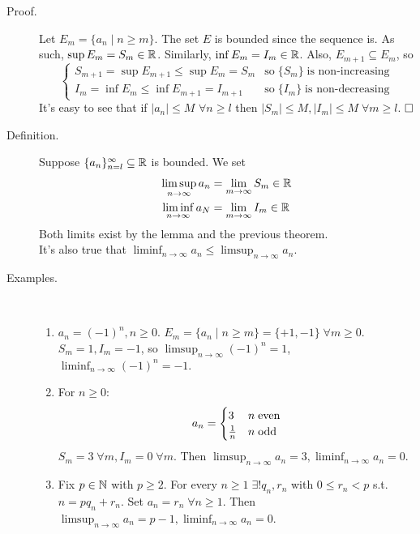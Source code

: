 \documentclass[letterpaper,11pt]{article}
\begin{document}
\begin{description}
\item[Proof.] Let $E_m=\{a_n\;|\;n\ge m\}$. The set $E$ is bounded
    since the sequence is. As such, $\sup E_m=S_m\in\mathbb{R}$. Similarly,
    $\inf E_m=I_m\in\mathbb{R}$. Also, $E_{m+1}\subseteq E_m$, so
    \[
    \begin{cases}
    S_{m+1}=\sup E_{m+1}\le\sup E_m=S_m &
        \text{so}\;\{S_m\}\;\text{is non-increasing}\\
    I_m=\inf E_m\le \inf E_{m+1}=I_{m+1} &
        \text{so}\;\{I_m\}\;\text{is non-decreasing}
    \end{cases}
    \]
    It's easy to see that if $|a_n|\le M$ $\forall n\ge l$ then
    $|S_m|\le M, |I_m|\le M\;\forall m\ge l$. $\hfill\square$


\item[Definition.] Suppose $\{a_n\}_{n=l}^\infty\subseteq\mathbb{R}$ is bounded. We set
    \begin{align*}
    \limsup_{n\to\infty}a_n &= \lim_{m\to\infty}S_m\in\mathbb{R}\\
    \liminf_{n\to\infty}a_N &= \lim_{m\to\infty}I_m\in\mathbb{R}
    \end{align*}
    Both limits exist by the lemma and the previous theorem.\\
    It's also true that $\liminf_{n\to\infty} a_n\le
    \limsup_{n\to\infty} a_n$.

\item[Examples.]\text{}\vspace{-0.2in}\\
  \begin{enumerate}[1)]
  \item $a_n=(-1)^n, n\ge 0$. $E_m=\{a_n\;|\;n\ge m\}=\{+1,-1\}
      \;\forall m\ge 0$. $S_m=1,I_m=-1$, so $\limsup_{n\to\infty}
      (-1)^n=1$, $\liminf_{n\to\infty}(-1)^n=-1$.
  \item For $n\ge 0$: \[
      a_n=\begin{cases}
        3 & n\;\text{even}\\
        \frac{1}{n} & n\;\text{odd}
        \end{cases}
      \]
      $S_m=3\;\forall m, I_m=0\;\forall m$. Then
      $\limsup_{n\to\infty} a_n=3,\liminf_{n\to\infty} a_n=0$.
  \item Fix $p\in\mathbb{N}$ with $p\ge 2$. For every $n\ge 1\;
      \exists! q_n,r_n$ with $0\le r_n<p$ s.t.\
      $n=pq_n+r_n$. Set $a_n=r_n\;\forall n\ge 1$.
      Then $\limsup_{n\to\infty}a_n=p-1,\liminf_{n\to\infty}a_n=0$.
  \end{enumerate}
\end{description}
\end{document}
